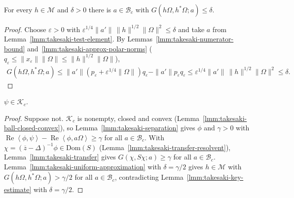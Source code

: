 \begin{lemma}
    \label{lmm:takesaki-key-estimate}
    \leanok
    For every $h \in \mathcal{M}$ and $\delta > 0$ there is $a \in \mathcal{B}_c$ with $G(h\Omega, h^*\Omega; a) \le \delta$.
\end{lemma}
\begin{proof}
    \leanok
    Choose $\varepsilon > 0$ with $\varepsilon^{1/4}\|a'\|\,\|h\|^{1/2}\|\Omega\|^2 \le \delta$ and take $a$ from Lemma~\ref{lmm:takesaki-test-element}. By Lemmas~\ref{lmm:takesaki-numerator-bound} and~\ref{lmm:takesaki-approx-polar-norms} ($q_\varepsilon \le \|x_\varepsilon\|\|\Omega\| \le \|h\|^{1/2}\|\Omega\|$),
    \begin{align}
        G(h\Omega, h^*\Omega; a) \le \|a'\|(p_\varepsilon + \varepsilon^{1/4}\|\Omega\|)q_\varepsilon - \|a'\|p_\varepsilon q_\varepsilon \le \varepsilon^{1/4}\|a'\|\,\|h\|^{1/2}\|\Omega\|^2 \le \delta.
    \end{align}
\end{proof}

\begin{lemma}
    \label{lmm:takesaki-resolvent-in-ball-closure}
    \leanok
    $\psi \in \mathcal{K}_c$.
\end{lemma}
\begin{proof}
    \leanok
    Suppose not. $\mathcal{K}_c$ is nonempty, closed and convex (Lemma~\ref{lmm:takesaki-ball-closed-convex}), so Lemma~\ref{lmm:takesaki-separation} gives $\phi$ and $\gamma > 0$ with $\operatorname{Re}\left< \phi, \psi \right> - \operatorname{Re}\left< \phi, a\Omega \right> \ge \gamma$ for all $a \in \mathcal{B}_c$. With $\chi = (\overline{z} - \Delta)^{-1}\phi \in \text{Dom}(S)$ (Lemma~\ref{lmm:takesaki-transfer-resolvent}), Lemma~\ref{lmm:takesaki-transfer} gives $G(\chi, S\chi; a) \ge \gamma$ for all $a \in \mathcal{B}_c$. Lemma~\ref{lmm:takesaki-uniform-approximation} with $\delta = \gamma/2$ gives $h \in \mathcal{M}$ with $G(h\Omega, h^*\Omega; a) > \gamma/2$ for all $a \in \mathcal{B}_c$, contradicting Lemma~\ref{lmm:takesaki-key-estimate} with $\delta = \gamma/2$.
\end{proof}

